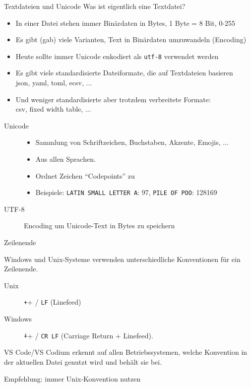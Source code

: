 \begin{frame}[c]{Textdateien und Unicode}
  Was ist eigentlich eine Textdatei?

  \begin{itemize}
    \item In einer Datei stehen immer Binärdaten in Bytes, 1 Byte = 8 Bit, 0-255
    \item Es gibt (gab) viele Varianten, Text in Binärdaten umzuwandeln (Encoding)
    \item Heute sollte immer Unicode enkodiert als \texttt{utf-8} verwendet werden
    \item Es gibt viele standardisierte Dateiformate, die auf Textdateien basieren\\
      json, yaml, toml, ecsv, ...
    \item Und weniger standardisierte aber trotzdem verbreitete Formate: \\
      csv, fixed width table, ...
  \end{itemize}

  \begin{description}
    \item[Unicode]
      \begin{itemize}
        \item Sammlung von Schriftzeichen, Buchstaben, Akzente, Emojis, ...
        \item Aus allen Sprachen.
        \item Ordnet Zeichen \enquote{Codepoints} zu
        \item Beispiele: \texttt{LATIN SMALL LETTER A}: 97, \texttt{PILE OF POO}: 128169
      \end{itemize}
    \item[UTF-8] Encoding um Unicode-Text in Bytes zu speichern
  \end{description}
\end{frame}

\begin{frame}[c]{Zeilenende}

  Windows und Unix-Systeme verwenden unterschiedliche Konventionen für ein Zeilenende.

  \begin{description}
    \item[Unix] \texttt+\n+ / \texttt{LF} (Linefeed)
    \item[Windows] \texttt+\r\n+ / \texttt{CR LF} (Carriage Return + Linefeed).
  \end{description}

  VS Code/VS Codium erkennt auf allen Betriebssystemen, welche Konvention in der aktuellen Datei
  genutzt wird und behält sie bei.

  Empfehlung: immer Unix-Konvention nutzen

\end{frame}

